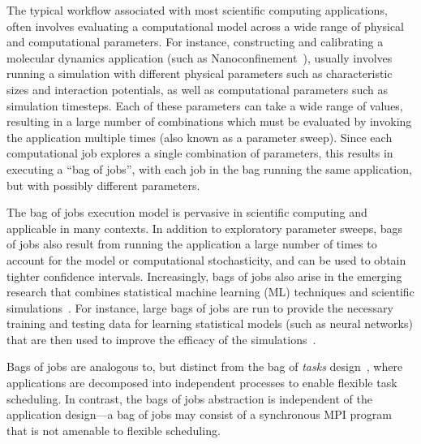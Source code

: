 The typical workflow associated with most scientific computing applications, often involves evaluating a computational model across a wide range of physical and computational parameters. 
For instance, constructing and calibrating a molecular dynamics application (such as Nanoconfinement~\cite{jcs2}), usually involves running a simulation with different physical parameters such as characteristic sizes and interaction potentials, as well as computational parameters such as simulation timesteps. 
Each of these parameters can take a wide range of values, resulting in a large number of combinations which must be evaluated by invoking the application multiple times (also known as a parameter sweep). 
Since each computational job explores a single combination of parameters, this results in executing a ``bag of jobs'', with each job in the bag running the same application, but with possibly different parameters.


The bag of jobs execution model is pervasive in scientific computing and applicable in many contexts.
In addition to exploratory parameter sweeps, bags of jobs also result from running the application a large number of times to account for the model or computational stochasticity, and can be used to obtain tighter confidence intervals. 
Increasingly, bags of jobs also arise in the emerging research that combines statistical machine learning (ML) techniques and scientific simulations~\cite{ml.atomic2017,melko2017,sam2017}. %
For instance, large bags of jobs are run to provide the necessary training and testing data for learning statistical models (such as neural networks) that are then used to improve the efficacy of the simulations~\cite{jcs2}.


Bags of jobs are analogous to, but distinct from the bag of \emph{tasks} design~\cite{bot-2003}, where applications are decomposed into independent processes to enable flexible task scheduling. 
In contrast, the bags of jobs abstraction is independent of the application design---a bag of jobs may consist of a synchronous MPI program that is not amenable to flexible scheduling. 




